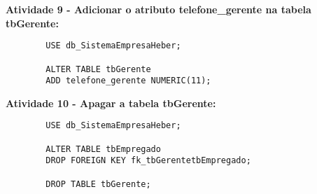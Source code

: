 \documentclass{article}
\begin{document}
	\textbf{Atividade 9 - Adicionar o atributo telefone\_gerente na tabela tbGerente:}
	\begin{verbatim}		
		USE db_SistemaEmpresaHeber;

		ALTER TABLE tbGerente
		ADD telefone_gerente NUMERIC(11);
	\end{verbatim}

	\textbf{Atividade 10 - Apagar a tabela tbGerente:}
	\begin{verbatim}		
		USE db_SistemaEmpresaHeber;

		ALTER TABLE tbEmpregado
		DROP FOREIGN KEY fk_tbGerentetbEmpregado;

		DROP TABLE tbGerente;
	\end{verbatim}
\end{document}
